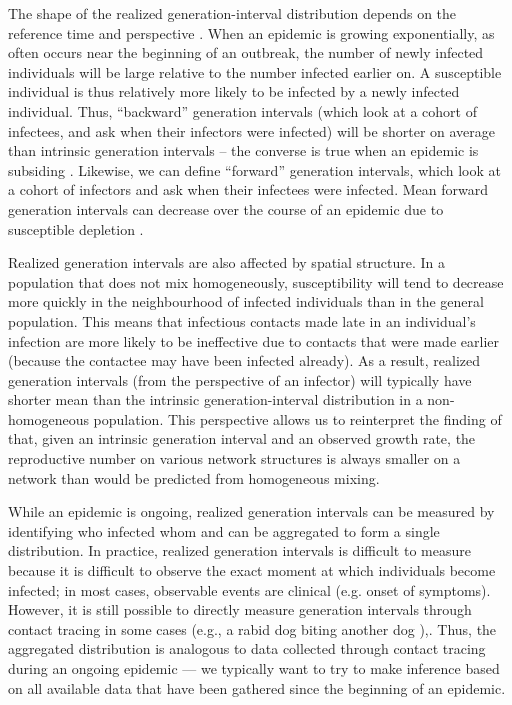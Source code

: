 \documentclass[12pt]{article}
\begin{document}
The shape of the realized generation-interval distribution depends on the reference time and perspective \citep{kenah2008generation, nishiura2010time, tomba2010some, champredon2015intrinsic, britton2019estimation}.
When an epidemic is growing exponentially, as often occurs near the beginning of an outbreak, the number of newly infected individuals will be large relative to the number infected earlier on. 
A susceptible individual is thus relatively more likely to be infected by a newly infected individual. 
Thus, ``backward'' generation intervals (which look at a cohort of infectees, and ask when their infectors were infected) will be shorter on average than intrinsic generation intervals -- the converse is true when an epidemic is subsiding \citep{nishiura2010time, champredon2015intrinsic, britton2019estimation}.
Likewise, we can define ``forward'' generation intervals, which look at a cohort of infectors and ask when their infectees were infected.
Mean forward generation intervals can decrease over the course of an epidemic due to susceptible depletion \citep{kenah2008generation, nishiura2010time, tomba2010some, champredon2015intrinsic}.

Realized generation intervals are also affected by spatial structure.
In a population that does not mix homogeneously, susceptibility will tend to decrease more quickly in the neighbourhood of infected individuals than in the general population.
This means that infectious contacts made late in an individual's infection are more likely to be ineffective due to contacts that were made earlier (because the contactee may have been infected already).
As a result, realized generation intervals (from the perspective of an infector) will typically have shorter mean than the intrinsic generation-interval distribution in a non-homogeneous population.
This perspective allows us to reinterpret the finding of \cite{trapman2016inferring} that, given an intrinsic generation interval and an observed growth rate, the reproductive number on various network structures is always smaller on a network than would be predicted from homogeneous mixing.

While an epidemic is ongoing, realized generation intervals can be measured by identifying who infected whom and can be aggregated to form a single distribution.
In practice, realized generation intervals is difficult to measure because it is difficult to observe the exact moment at which individuals become infected;
in most cases, observable events are clinical (e.g. onset of symptoms).
However, it is still possible to directly measure generation intervals through contact tracing in some cases (e.g., a rabid dog biting another dog \citep{hampson2009transmission}),.
Thus, the aggregated distribution is analogous to data collected through contact tracing during an ongoing epidemic ---
we typically want to try to make inference based on all available data that have been gathered since the beginning of an epidemic.
\end{document}
